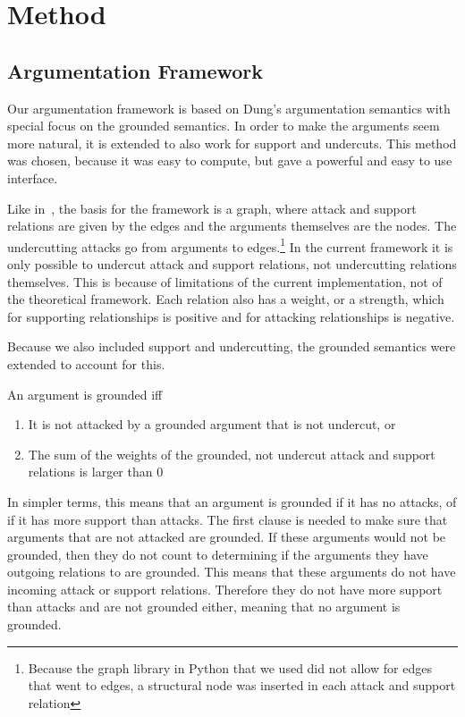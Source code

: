\section{Method}

\subsection{Argumentation Framework}
Our argumentation framework is based on Dung's argumentation semantics
\cite{dungargfund} with special focus on the grounded semantics. In order
to make the arguments seem more natural, it is extended to also work for
support and undercuts. This method was chosen, because it was easy to
compute, but gave a powerful and easy to use interface.

Like in~\cite{dungargfund}, the basis for the framework is a graph, where
attack and support relations are given by the edges and the arguments
themselves are the nodes. The undercutting attacks go from arguments to
edges.\footnote{Because the graph library in Python that we used did not
    allow for edges that went to edges, a structural node was inserted in
    each attack and support relation} 
In the current framework it is only
possible to undercut attack and support relations, not undercutting
relations themselves. This is because of limitations of the current
implementation, not of the theoretical framework. Each relation also has a
weight, or a strength, which for supporting relationships is positive and
for attacking relationships is negative.

Because we also included support and undercutting, the grounded semantics
were extended to account for this.
\begin{defn}\label{def:grounded}
    An argument is grounded iff
    \begin{enumerate}
        \item It is not attacked by a grounded argument that is not
            undercut, or
        \item The sum of the weights of the grounded, not undercut attack
            and support relations is larger than 0
    \end{enumerate}
\end{defn}

In simpler terms, this means that an argument is grounded if it has no
attacks, of if it has more support than attacks. The first clause is needed
to make sure that arguments that are not attacked are grounded. If these
arguments would not be grounded, then they do not count to determining if
the arguments they have outgoing relations to are grounded. This means that these
arguments do not have incoming attack or support relations. Therefore they
do not have more support than attacks and are not grounded either, meaning
that no argument is grounded. 

